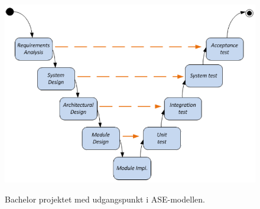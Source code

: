 \begin{figure}[H] 
\centering
{\includegraphics[width=12cm]
{Figure/vmodel}}
\caption{Bachelor projektet med udgangspunkt i ASE-modellen.}
\label{vmodel}
\end{figure}



  

